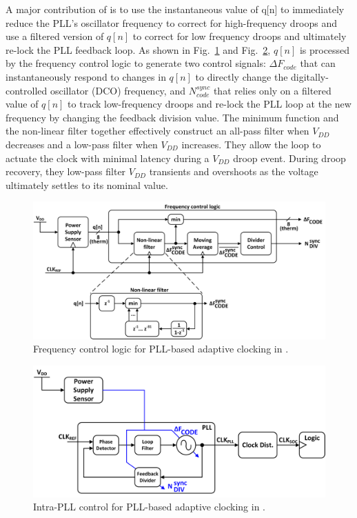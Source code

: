 \documentclass[twoside,9pt,journal,letterpage]{IEEEtran}
\begin{document}
A major contribution of \cite{hashimoto2018} is to use the instantaneous value of q[n] to immediately reduce the PLL's oscillator frequency to correct for high-frequency droops and use a filtered version of $q[n]$ to correct for low frequency droops and ultimately re-lock the PLL feedback loop. As shown in Fig.\ \ref{fig:detail_pll} and Fig.\ \ref{fig:detail_pllarch}, $q[n]$ is processed by the frequency control logic to generate two control signals: $\Delta F_{code}$ that can instantaneously respond to changes in $q[n]$ to directly change the digitally-controlled oscillator (DCO) frequency, and $N^{sync}_{code}$ that relies only on a filtered value of $q[n]$ to track low-frequency droops and re-lock the PLL loop at the new frequency by changing the feedback division value. The minimum function and the non-linear filter together effectively construct an all-pass filter when $V_{DD}$ decreases and a low-pass filter when $V_{DD}$ increases. They allow the loop to actuate the clock with minimal latency during a $V_{DD}$ droop event. During droop recovery, they low-pass filter $V_{DD}$ transients and overshoots as the voltage ultimately settles to its nominal value.

\begin{figure}[h]
	\centering
	\includegraphics[width=\columnwidth]{fig_detail_pll}
	\caption{Frequency control logic for PLL-based adaptive clocking in \cite{hashimoto2018}.}
	\label{fig:detail_pll}
\end{figure}

\begin{figure}[h]
	\centering
	\includegraphics[width=\columnwidth]{fig_detail_pllarch}
	\caption{Intra-PLL control for PLL-based adaptive clocking in \cite{hashimoto2018}.}
	\label{fig:detail_pllarch}
\end{figure}
\end{document}

